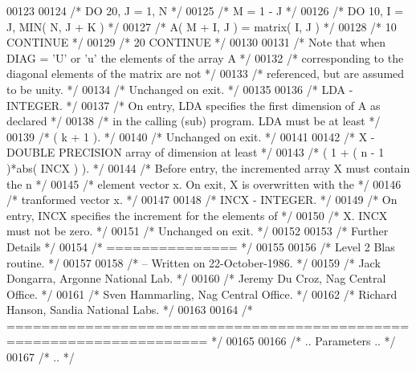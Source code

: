 \begin{DoxyCode}
00123 
00124 \textcolor{comment}{/*                 DO 20, J = 1, N */}
00125 \textcolor{comment}{/*                    M = 1 - J */}
00126 \textcolor{comment}{/*                    DO 10, I = J, MIN( N, J + K ) */}
00127 \textcolor{comment}{/*                       A( M + I, J ) = matrix( I, J ) */}
00128 \textcolor{comment}{/*              10    CONTINUE */}
00129 \textcolor{comment}{/*              20 CONTINUE */}
00130 
00131 \textcolor{comment}{/*           Note that when DIAG = 'U' or 'u' the elements of the array A */}
00132 \textcolor{comment}{/*           corresponding to the diagonal elements of the matrix are not */}
00133 \textcolor{comment}{/*           referenced, but are assumed to be unity. */}
00134 \textcolor{comment}{/*           Unchanged on exit. */}
00135 
00136 \textcolor{comment}{/*  LDA    - INTEGER. */}
00137 \textcolor{comment}{/*           On entry, LDA specifies the first dimension of A as declared */}
00138 \textcolor{comment}{/*           in the calling (sub) program. LDA must be at least */}
00139 \textcolor{comment}{/*           ( k + 1 ). */}
00140 \textcolor{comment}{/*           Unchanged on exit. */}
00141 
00142 \textcolor{comment}{/*  X      - DOUBLE PRECISION array of dimension at least */}
00143 \textcolor{comment}{/*           ( 1 + ( n - 1 )*abs( INCX ) ). */}
00144 \textcolor{comment}{/*           Before entry, the incremented array X must contain the n */}
00145 \textcolor{comment}{/*           element vector x. On exit, X is overwritten with the */}
00146 \textcolor{comment}{/*           tranformed vector x. */}
00147 
00148 \textcolor{comment}{/*  INCX   - INTEGER. */}
00149 \textcolor{comment}{/*           On entry, INCX specifies the increment for the elements of */}
00150 \textcolor{comment}{/*           X. INCX must not be zero. */}
00151 \textcolor{comment}{/*           Unchanged on exit. */}
00152 
00153 \textcolor{comment}{/*  Further Details */}
00154 \textcolor{comment}{/*  =============== */}
00155 
00156 \textcolor{comment}{/*  Level 2 Blas routine. */}
00157 
00158 \textcolor{comment}{/*  -- Written on 22-October-1986. */}
00159 \textcolor{comment}{/*     Jack Dongarra, Argonne National Lab. */}
00160 \textcolor{comment}{/*     Jeremy Du Croz, Nag Central Office. */}
00161 \textcolor{comment}{/*     Sven Hammarling, Nag Central Office. */}
00162 \textcolor{comment}{/*     Richard Hanson, Sandia National Labs. */}
00163 
00164 \textcolor{comment}{/*  ===================================================================== */}
00165 
00166 \textcolor{comment}{/*     .. Parameters .. */}
00167 \textcolor{comment}{/*     .. */}

\end{DoxyCode}
